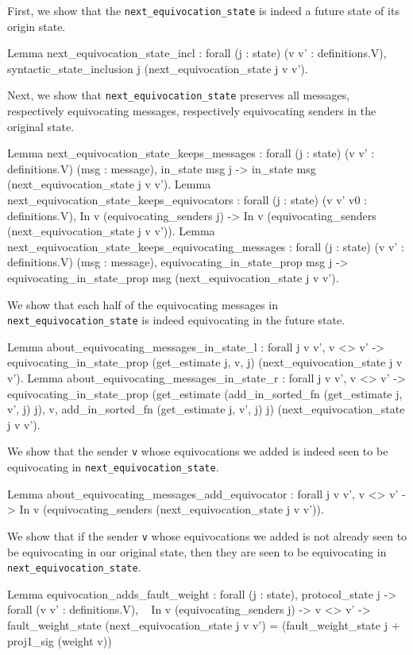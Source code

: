 \documentclass[runningheads]{llncs}
\begin{document}
First, we show that the \verb|next_equivocation_state| is indeed a future state of its origin state. 
\begin{coq} 
Lemma next_equivocation_state_incl :
	forall (j : state) (v v' : definitions.V),
	syntactic_state_inclusion j (next_equivocation_state j v v'). 
\end{coq}
Next, we show that \verb|next_equivocation_state|  preserves all messages, respectively equivocating messages, respectively equivocating senders in the original state. 
\begin{coq}
Lemma next_equivocation_state_keeps_messages :
	forall (j : state) (v v' : definitions.V) (msg : message),
	in_state msg j ->
	in_state msg (next_equivocation_state j v v'). 
Lemma next_equivocation_state_keeps_equivocators :
	forall (j : state) (v v' v0 : definitions.V),
	In v (equivocating_senders j) ->
	In v (equivocating_senders (next_equivocation_state j v v')). 
Lemma next_equivocation_state_keeps_equivocating_messages :
	forall (j : state) (v v' : definitions.V) (msg : message),
	equivocating_in_state_prop msg j ->
	equivocating_in_state_prop msg (next_equivocation_state j v v'). 
\end{coq}
We show that each half of the equivocating messages in \verb|next_equivocation_state|  is indeed equivocating in the future state. 
\begin{coq}
Lemma about_equivocating_messages_in_state_l :
	forall j v v',
	v <> v' ->
	equivocating_in_state_prop (get_estimate j, v, j)
	(next_equivocation_state j v v').
Lemma about_equivocating_messages_in_state_r :
	forall j v v',
	v <> v' ->
	equivocating_in_state_prop (get_estimate (add_in_sorted_fn 
	(get_estimate j, v', j) j), v, 
	add_in_sorted_fn (get_estimate j, v', j) j)
	(next_equivocation_state j v v').
\end{coq}
We show that the sender \verb|v| whose equivocations we added is indeed seen to be equivocating in \verb|next_equivocation_state|. 
\begin{coq}
Lemma about_equivocating_messages_add_equivocator :
	forall j v v',
	v <> v' ->
	In v (equivocating_senders (next_equivocation_state j v v')).
\end{coq}
We show that if the sender \verb|v| whose equivocations we added is not already seen to be equivocating in our original state, then they are seen to be equivocating in \verb|next_equivocation_state|. 
\begin{coq}
Lemma equivocation_adds_fault_weight : 
	forall (j : state),
	protocol_state j ->
	forall (v v' : definitions.V),
	~ In v (equivocating_senders j) -> 
	v <> v' ->  
	fault_weight_state (next_equivocation_state j v v') = 
	(fault_weight_state j + proj1_sig (weight v))%
\end{coq}
\end{document}
